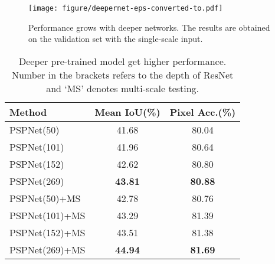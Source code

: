 \documentclass[10pt,twocolumn,letterpaper]{article}
\begin{document}
\begin{figure}[t]
\begin{center}
    \texttt{[image: figure/deepernet-eps-converted-to.pdf]}
\end{center}
\caption{Performance grows with deeper networks. The results are obtained on the
validation set with the single-scale input.} \label{fig:deepernet}
\end{figure}

\begin{table}
\footnotesize
\begin{center}
\begin{tabular}{ l c c}
\hline
Method & Mean IoU(\%) & Pixel Acc.(\%) \\
\hline\hline
PSPNet(50) & 41.68 & 80.04 \\
PSPNet(101) & 41.96 & 80.64 \\
PSPNet(152) & 42.62 & 80.80 \\
PSPNet(269) & \textbf{43.81} & \textbf{80.88} \\
\hline\hline
PSPNet(50)+MS & 42.78 & 80.76 \\
PSPNet(101)+MS & 43.29 & 81.39 \\
PSPNet(152)+MS & 43.51 & 81.38 \\
PSPNet(269)+MS & \textbf{44.94} & \textbf{81.69} \\
\hline
\end{tabular}
\end{center}
\caption{Deeper pre-trained model get higher performance. Number in the brackets refers
to the depth of ResNet and `MS' denotes multi-scale testing.} \label{tab:deepernet}
\end{table}
\end{document}

